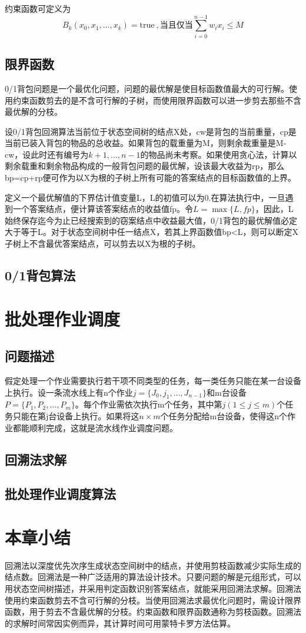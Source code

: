 约束函数可定义为
\begin{equation}
B_k(x_0,x_1,\dots,x_k)=\mathrm{true}\ ,\text{当且仅当}\sum_{i=0}^{n-1}w_ix_i\leq M
\end{equation}
\subsection*{限界函数}
0/1背包问题是一个最优化问题，问题的最优解是使目标函数值最大的可行解。使用约束函数剪去的是不含可行解的子树，而使用限界函数可以进一步剪去那些不含最优解的分枝。

设0/1背包回溯算法当前位于状态空间树的结点X处，cw是背包的当前重量，cp是当前已装入背包的物品的总收益。如果背包的载重量为M，则剩余裁重量是M-cw，设此时还有编号为$k+1,\dots,n-1$的物品尚未考察。如果使用贪心法，计算以剩余载重和剩余物品构成的一般背包问题的最优解，设该最大收益为rp，那么bp=cp+rp便可作为以X为根的子树上所有可能的答案结点的目标函数值的上界。

定义一个最优解值的下界估计值变量L，L的初值可以为0.在算法执行中，一旦遇到一个答案结点，便计算该答案结点的收益值fp。令$L=\max \{L,fp\}$，因此，L始终保存迄今为止已经搜索到的窃案结点中收益最大值，0/1背包的最优解值必定大于等于L。对于状态空间树中任一结点X，若其上界函数值bp<L，则可以断定X子树上不含最优答案结点，可以剪去以X为根的子树。
\subsection*{0/1背包算法}
\section{批处理作业调度}
\subsection*{问题描述}
假定处理一个作业需要执行若干项不同类型的任务，每一类任务只能在某一台设备上执行。设一条流水线上有n个作业$j=\{J_0,j_1,\dots, J_{n-1}\}$和m台设备$P=\{P_1,P_2,\dots, P_m\}$。每个作业需依次执行m个任务，其中第$j(1\leq j\leq m)$个任务只能在第j台设备上执行。如果将这$n\times m$个任务分配给m台设备，使得这n个作业都能顺利完成，这就是流水线作业调度问题。
\subsection*{回溯法求解}
\subsection*{批处理作业调度算法}
\section{本章小结}
回溯法以深度优先次序生成状态空间树中的结点，并使用剪枝函数减少实际生成的结点数。回溯法是一种广泛适用的算法设计技术。只要问题的解是元组形式，可以用状态空间树描述，并采用判定函数识别答案结点，就能采用回溯法求解。回溯法使用约束函数剪去不含可行解的分枝。当使用回溯法求最优化问题时，需设计限界函数，用于剪去不含最优解的分枝。约束函数和限界函数通称为剪枝函数。回溯法的求解时间常因实例而异，其计算时间可用蒙特卡罗方法估算。